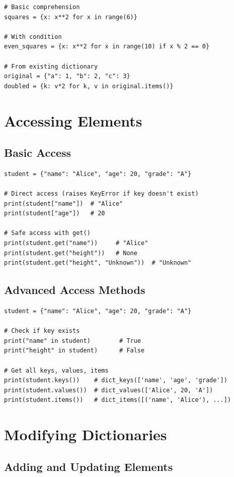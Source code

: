 \documentclass[12pt,a4paper]{article}
\begin{document}
\begin{lstlisting}
# Basic comprehension
squares = {x: x**2 for x in range(6)}

# With condition
even_squares = {x: x**2 for x in range(10) if x % 2 == 0}

# From existing dictionary
original = {"a": 1, "b": 2, "c": 3}
doubled = {k: v*2 for k, v in original.items()}
\end{lstlisting}

\section{Accessing Elements}

\subsection{Basic Access}

\begin{lstlisting}
student = {"name": "Alice", "age": 20, "grade": "A"}

# Direct access (raises KeyError if key doesn't exist)
print(student["name"])  # "Alice"
print(student["age"])   # 20

# Safe access with get()
print(student.get("name"))     # "Alice"
print(student.get("height"))   # None
print(student.get("height", "Unknown"))  # "Unknown"
\end{lstlisting}

\subsection{Advanced Access Methods}

\begin{lstlisting}
student = {"name": "Alice", "age": 20, "grade": "A"}

# Check if key exists
print("name" in student)        # True
print("height" in student)      # False

# Get all keys, values, items
print(student.keys())    # dict_keys(['name', 'age', 'grade'])
print(student.values())  # dict_values(['Alice', 20, 'A'])
print(student.items())   # dict_items([('name', 'Alice'), ...])
\end{lstlisting}

\section{Modifying Dictionaries}

\subsection{Adding and Updating Elements}
\end{document}

